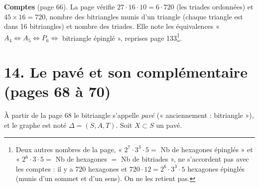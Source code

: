 \documentclass[11pt,a4paper]{article}
\begin{document}
\textbf{Comptes} (page 66). La page vérifie $27 \cdot 16 \cdot 10 = 6 \cdot 720$
(les triades ordonnées) et $45 \times 16 = 720$, nombre des bitriangles munis
d'un triangle (chaque triangle est dans 16 bitriangles) et nombre des triades.
Elle note les équivalences « $A_4 \Leftrightarrow A_5 \Leftrightarrow P_6
\Leftrightarrow$ bitriangle épinglé », reprises page 133\footnote{Deux autres
nombres de la page, « $2^7 \cdot 3^3 \cdot 5 =$ Nb de hexagones épinglés » et
« $2^6 \cdot 3 \cdot 5 =$ Nb de hexagones $=$ Nb de bitriades », ne
s'accordent pas avec les comptes : il y a 720 hexagones et $720 \cdot 12 =
2^6 \cdot 3^3 \cdot 5$ hexagones épinglés (munis d'un sommet et d'un sens). On
ne les retient pas.}.

\section*{14. Le pavé et son complémentaire (pages 68 à 70)}

À partir de la page 68 le bitriangle s'appelle \emph{pavé} (« anciennement :
bitriangle »), et le graphe est noté $\Delta = (S, A, T)$. Soit $X \subset S$
un pavé.
\end{document}
